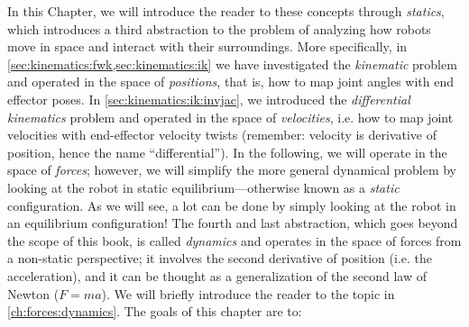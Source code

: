 In this Chapter, we will introduce the reader to these concepts through \emph{statics}, which introduces a third abstraction to the problem of analyzing how robots move in space and interact with their surroundings.
More specifically, in \cref{sec:kinematics:fwk,sec:kinematics:ik} we have investigated the \textsl{kinematic} problem and operated in the space of \textsl{positions}, that is, how to map joint angles with end effector poses.
In \cref{sec:kinematics:ik:invjac}, we introduced the \textsl{differential kinematics} problem and operated in the space of \textsl{velocities}, i.e. how to map joint velocities with end-effector velocity twists (remember: velocity is derivative of position, hence the name ``differential'').
In the following, we will operate in the space of \textsl{forces}; however, we will simplify the more general dynamical problem by looking at the robot in static equilibrium---otherwise known as a \textsl{static} configuration.
As we will see, a lot can be done by simply looking at the robot in an equilibrium configuration!
The fourth and last abstraction, which goes beyond the scope of this book, is called \textsl{dynamics} and operates in the space of forces from a non-static perspective; it involves the second derivative of position (i.e. the acceleration), and it can be thought as a generalization of the second law of Newton ($F=ma$).
We will briefly introduce the reader to the topic in \cref{ch:forces:dynamics}.
%
The goals of this chapter are to:


